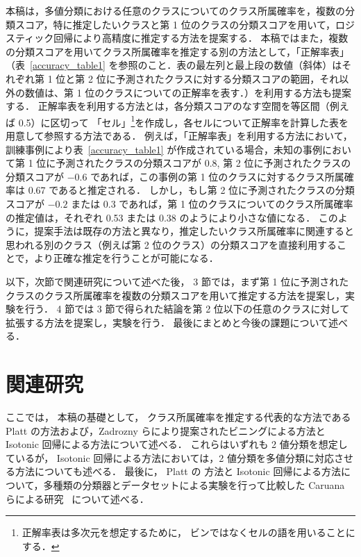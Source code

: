 \documentclass[japanese]{jnlp_1.4}
\begin{document}
本稿は，多値分類における任意のクラスについてのクラス所属確率を，複数の分類スコア，特に推定したいクラスと第 1 位のクラスの分類スコアを用いて，ロジスティック回帰により高精度に推定する方法を提案する．
本稿ではまた，複数の分類スコアを用いてクラス所属確率を推定する別の方法として，「正解率表」（表~\ref{accuracy_table1} を参照のこと．表の最左列と最上段の数値（斜体）はそれぞれ第 1 位と第 2 位に予測されたクラスに対する分類スコアの範囲，それ以外の数値は、第 1 位のクラスについての正解率を表す．）を利用する方法も提案する．
正解率表を利用する方法とは，各分類スコアのなす空間を等区間（例えば 0.5）に区切って
「セル」\footnote{
	正解率表は多次元を想定するために，
	ビンではなくセルの語を用いることにする．
}を作成し，各セルについて正解率を計算した表を用意して参照する方法である．
例えば，「正解率表」を利用する方法において，
訓練事例により表~\ref{accuracy_table1} が作成されている場合，未知の事例において第 1 位に予測されたクラスの分類スコアが 0.8, 第 2 位に予測されたクラスの分類スコアが $-0.6$ であれば，この事例の第 1 位のクラスに対するクラス所属確率は 0.67 であると推定される．
しかし，もし第 2 位に予測されたクラスの分類スコアが $-0.2$ または 0.3 であれば，第 1 位のクラスについてのクラス所属確率の推定値は，それぞれ 0.53 または 0.38 のようにより小さな値になる．
このように，提案手法は既存の方法と異なり，推定したいクラス所属確率に関連すると思われる別のクラス（例えば第 2 位のクラス）の分類スコアを直接利用することで，より正確な推定を行うことが可能になる．


\begin{table}[b]
\begin{center}
\label{accuracy_table1}

\end{center}
\end{table}

以下，次節で関連研究について述べた後，
3 節では，まず第 1 位に予測されたクラスのクラス所属確率を複数の分類スコアを用いて推定する方法を提案し，実験を行う．
4 節では 3 節で得られた結論を第 2 位以下の任意のクラスに対して拡張する方法を提案し，実験を行う．
最後にまとめと今後の課題について述べる．

\section{関連研究}\label{sec:kanren}

ここでは，
本稿の基礎として，
クラス所属確率を推定する代表的な方法である Platt の方法および，Zadrozny らにより提案されたビニングによる方法と Isotonic 回帰による方法について述べる．
これらはいずれも 2 値分類を想定しているが，
Isotonic 回帰による方法においては，2 値分類を多値分類に対応させる方法についても述べる．
最後に，
Platt の 方法と Isotonic 回帰による方法について，多種類の分類器とデータセットによる実験を行って比較した Caruana らによる研究~\cite{Caruana04,Mizil05} について述べる．
\end{document}
